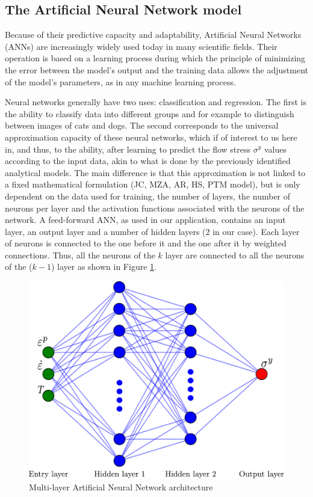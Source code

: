 \documentclass[twoside,english,1p,final,sort&compress]{elsarticle}
\theoremstyle{plain}
\begin{document}
\subsection{The Artificial Neural Network model\label{sec:ANNmodel}}

Because of their predictive capacity and adaptability, Artificial Neural Networks (ANNs) are increasingly widely used today in many scientific fields. Their operation is based on a learning process during which the principle of minimizing the error between the model's output and the training data allows the adjustment of the model's parameters, as in any machine learning process.

Neural networks generally have two uses: classification and regression.
The first is the ability to classify data into different groups and for example to distinguish between images of cats and dogs. The second corresponds to the universal approximation capacity of these neural networks, which if of interest to us here in, and thus, to the ability, after learning to predict the flow stress $\sigma^y$ values according to the input data, akin to what is done by  the previously identified analytical models. 
The main difference is that this approximation is not linked to a fixed mathematical formulation (JC, MZA, AR, HS, PTM model), but is only dependent on the data used for training, the number of layers, the number of neurons per layer and the activation functions associated with the neurons of the network.
A feed-forward ANN, as used in our application, contains an input layer, an output layer and a number of hidden layers ($2$ in our case).
Each layer of neurons is connected to the one before it and the one after it by weighted connections.
Thus, all the neurons of the $k$ layer are connected to all the neurons of the ($k-1$) layer as shown in Figure \ref{fig:ANN-2HL}.
\begin{figure}[!ht]
\centering
\includegraphics[width=0.7\columnwidth]
{Figures/ANN-scheme-2HL}
\caption{Multi-layer Artificial Neural Network architecture}
\label{fig:ANN-2HL}
\end{figure}
\end{document}
